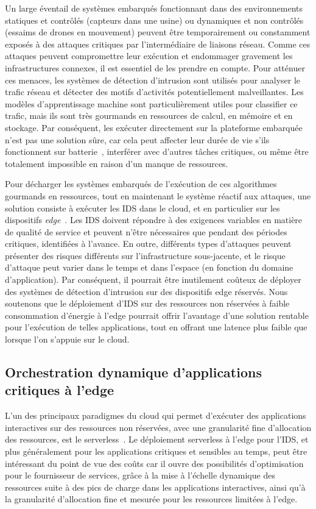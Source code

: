 Un large éventail de systèmes embarqués fonctionnant dans des environnements statiques et contrôlés (capteurs dans une usine) ou dynamiques et non contrôlés (essaims de drones en mouvement) peuvent être temporairement ou constamment exposés à des attaques critiques par l'intermédiaire de liaisons réseau. Comme ces attaques peuvent compromettre leur exécution et endommager gravement les infrastructures connexes, il est essentiel de les prendre en compte. Pour atténuer ces menaces, les systèmes de détection d'intrusion sont utilisés pour analyser le trafic réseau et détecter des motifs d'activités potentiellement malveillantes. Les modèles d'apprentissage machine sont particulièrement utiles pour classifier ce trafic, mais ils sont très gourmands en ressources de calcul, en mémoire et en stockage. Par conséquent, les exécuter directement sur la plateforme embarquée n'est pas une solution sûre, car cela peut affecter leur durée de vie s'ils fonctionnent sur batterie~\cite{slimani:hal-04159551}, interférer avec d'autres tâches critiques, ou même être totalement impossible en raison d'un manque de ressources.

Pour décharger les systèmes embarqués de l'exécution de ces algorithmes gourmands en ressources, tout en maintenant le système réactif aux attaques, une solution consiste à exécuter les \gls{IDS} dans le cloud, et en particulier sur les dispositifs \textit{edge}~\cite{eskandari2020}. Les \gls{IDS} doivent répondre à des exigences variables en matière de qualité de service et peuvent n'être nécessaires que pendant des périodes critiques, identifiées à l'avance. En outre, différents types d'attaques peuvent présenter des risques différents sur l'infrastructure sous-jacente, et le risque d'attaque peut varier dans le temps et dans l'espace (en fonction du domaine d'application). Par conséquent, il pourrait être inutilement coûteux de déployer des systèmes de détection d'intrusion sur des dispositifs edge réservés. Nous soutenons que le déploiement d'\gls{IDS} sur des ressources non réservées à faible consommation d'énergie à l'edge pourrait offrir l'avantage d'une solution rentable pour l'exécution de telles applications, tout en offrant une latence plus faible que lorsque l'on s'appuie sur le cloud.

\subsection{Orchestration dynamique d'applications critiques à l'edge}

L'un des principaux paradigmes du cloud qui permet d'exécuter des applications interactives sur des ressources non réservées, avec une granularité fine d'allocation des ressources, est le serverless~\cite{Lannurien2023}. Le déploiement serverless à l'edge pour l'\gls{IDS}, et plus généralement pour les applications critiques et sensibles au temps, peut être intéressant du point de vue des coûts car il ouvre des possibilités d'optimisation pour le fournisseur de services, grâce à la mise à l'échelle dynamique des ressources suite à des pics de charge dans les applications interactives, ainsi qu'à la granularité d'allocation fine et mesurée pour les ressources limitées à l'edge.

